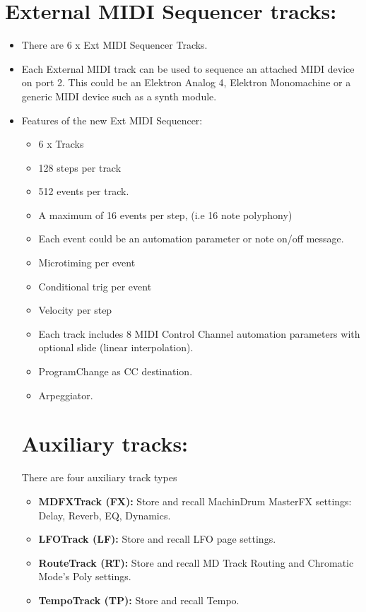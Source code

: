 \section{External MIDI Sequencer tracks:}
\begin{itemize}
\item There are 6 x Ext MIDI Sequencer Tracks.
\item Each External MIDI track can be used to sequence an attached MIDI device on port 2. This could be an Elektron Analog 4, Elektron Monomachine or a generic MIDI device such as a synth module.
\item
    Features of the new Ext MIDI Sequencer:
\begin{itemize}
    \item 6 x Tracks
    \item 128 steps per track
	\item 512 events per track.
    \item A maximum of 16 events per step, (i.e 16 note polyphony)
	\item Each event could be an automation parameter or note on/off message.
    \item Microtiming per event
    \item Conditional trig per event
    \item Velocity per step
    \item Each track includes 8 MIDI Control Channel automation parameters with optional slide (linear interpolation).
    \item ProgramChange as CC destination.
    \item Arpeggiator.
\end{itemize}

\section{Auxiliary tracks:}
There are four auxiliary track types
 \begin{itemize}
 \item \textbf{MDFXTrack (FX):} Store and recall MachinDrum MasterFX settings: Delay, Reverb, EQ, Dynamics.
 \item \textbf{LFOTrack (LF):} Store and recall LFO page settings.
 \item \textbf{RouteTrack (RT):} Store and recall MD Track Routing and Chromatic Mode's Poly settings.
 \item \textbf{TempoTrack (TP):} Store and recall Tempo.

 
    \end{itemize}
\end{itemize}
